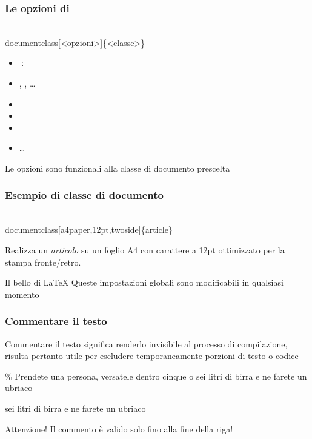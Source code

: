 \documentclass[10pt,svgnames,%
ucs,%
pdftex]{mybeamer}
\begin{document}
\begin{frame}
	\frametitle{Le opzioni di }
	\begin{LaTeXcode}
		\\documentclass[\alert{<opzioni>}]\{<classe>\}
	\end{LaTeXcode}
	\begin{itemize}
		\item \Lopt{8pt} $\div$ \Lopt{12pt}
		\item {}, , \dots
		\item {}%
		\item {}%
		\item {}%
		\item \dots
	\end{itemize}
	\bigskip
	Le opzioni sono funzionali alla classe di documento prescelta
\end{frame}
\begin{frame}
	\frametitle{Esempio di classe di documento}
	\begin{LaTeXcode}
		\\documentclass[\alert{a4paper,12pt,twoside}]\{\alert{article}\}
	\end{LaTeXcode}
	Realizza un \emph{articolo} su un foglio \alert{A4} con carattere
	a \alert{12pt} ottimizzato per la stampa \alert{fronte/retro}.
	\bigskip
	\onslide<2->
	\begin{block}{Il bello di \LaTeX}
		Queste impostazioni globali sono modificabili in qualsiasi momento
	\end{block}
\end{frame}
\begin{frame}
	\frametitle{Commentare il testo}
	Commentare il testo significa renderlo invisibile al processo di
	compilazione, risulta pertanto utile per escludere temporaneamente
	porzioni di testo o codice
	\begin{LaTeXcode}
		\% Prendete una persona, versatele dentro cinque o\n
		sei litri di birra e ne farete un ubriaco
	\end{LaTeXcode}
	\begin{LaTeXoutput}
		sei litri di birra e ne farete un ubriaco
	\end{LaTeXoutput}
	\begin{block}{Attenzione!}
		Il commento \`e valido solo fino alla fine della riga!
	\end{block}
\end{frame}
\end{document}
